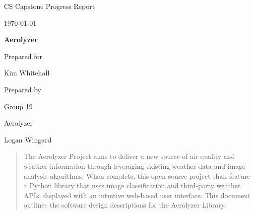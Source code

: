 \documentclass[onecolumn, draftclsnofoot,10pt, compsoc]{IEEEtran}
\def \CapstoneTeamName{		Aerolyzer}
\def \CapstoneTeamNumber{		19}
\def \GroupMemberOne{			Logan Wingard}
\def \CapstoneProjectName{		Aerolyzer}
\def \CapstoneSponsorPerson{		Kim Whitehall}
\def \DocType{		%
	Progress Report
}
\newcommand{\NameSigPair}[1]{\par
	\makebox[2.75in][r]{#1} \hfil 	\makebox[3.25in]{\makebox[2.25in]{\hrulefill} \hfill		\makebox[.75in]{\hrulefill}}
	\par\vspace{-12pt} \textit{\tiny\noindent
		\makebox[2.75in]{} \hfil		\makebox[3.25in]{\makebox[2.25in][r]{Signature} \hfill	\makebox[.75in][r]{Date}}}}
\renewcommand{\NameSigPair}[1]{#1}
\begin{document}
	\begin{titlepage}
		\begin{singlespace}

			\centering
			\hfill 
			\par\vspace{.2in}
			\centering
			\scshape{
				\huge CS Capstone \DocType \par
				{\large\today}\par
				\vspace{.5in}
				\textbf{\Huge\CapstoneProjectName}\par
				\vfill
				{\large Prepared for}\par
				\vspace{5pt}
				{\Large\NameSigPair{\CapstoneSponsorPerson}\par}
				{\large Prepared by }\par
				Group\CapstoneTeamNumber\par
				\CapstoneTeamName\par 
				\vspace{5pt}
				{\large
					\NameSigPair{\GroupMemberOne}\par
				}
				\vspace{20pt}
			}
			\begin{abstract}  
				The Aerolyzer Project aims to deliver a new source of air quality and weather information through leveraging existing weather data and image analysis algorithms.
				When complete, this open-source project shall feature a Python library that uses image classification and third-party weather APIs, displayed with an intuitive web-based user interface.
				This document outlines the software design descriptions for the Aerolyzer Library.
		
			\end{abstract}     
		\end{singlespace}
	\end{titlepage}

\tableofcontents


\clearpage
\end{document}
